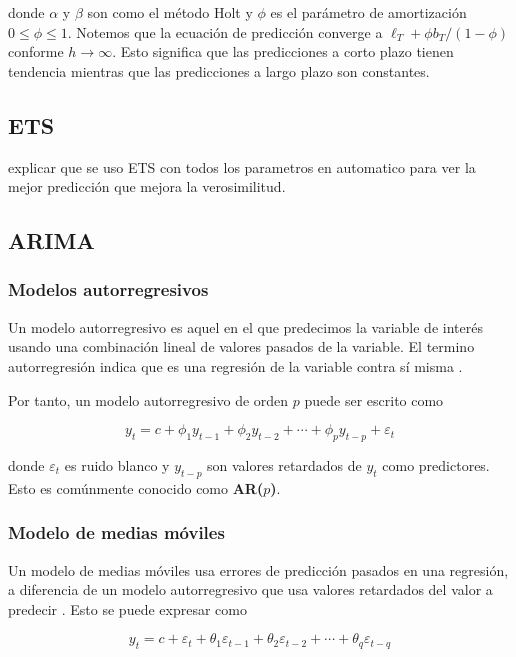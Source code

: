 donde $\alpha$ y $\beta$ son como el método Holt y $\phi$ es el parámetro de amortización $0 \leq \phi \leq 1$.
Notemos que la ecuación de predicción converge a $\ell_{T}+\phi b_{T} /(1-\phi)$ conforme $h \rightarrow \infty$. Esto significa que las predicciones a corto plazo tienen tendencia mientras que las predicciones a largo plazo son constantes.

\subsection{ETS}

explicar que se uso ETS con todos los parametros en automatico para ver la mejor predicción que mejora la verosimilitud.

\subsection{ARIMA}

\subsubsection{Modelos autorregresivos}

Un modelo autorregresivo es aquel en el que predecimos la variable de interés usando una combinación lineal de valores pasados de la variable. El termino autorregresión indica que es una regresión de la variable contra sí misma \cite{hyndmanForecastingPrinciplesPractice}.

Por tanto, un modelo autorregresivo de orden $p$ puede ser escrito como 

\[ y_{t}=c+\phi_{1} y_{t-1}+\phi_{2} y_{t-2}+\cdots+\phi_{p} y_{t-p}+\varepsilon_{t} \]

donde $\varepsilon_{t}$ es ruido blanco y $y_{t-p}$ son valores retardados de $y_t$ como predictores. Esto es comúnmente conocido como \textbf{AR($p$)}.

\subsubsection{Modelo de medias móviles}

Un modelo de medias móviles usa errores de predicción pasados en una regresión, a diferencia de un modelo autorregresivo que usa valores retardados del valor a predecir \cite{hyndmanForecastingPrinciplesPractice}. Esto se puede expresar como

\[ y_{t}=c+\varepsilon_{t}+\theta_{1} \varepsilon_{t-1}+\theta_{2} \varepsilon_{t-2}+\cdots+\theta_{q} \varepsilon_{t-q} \]

